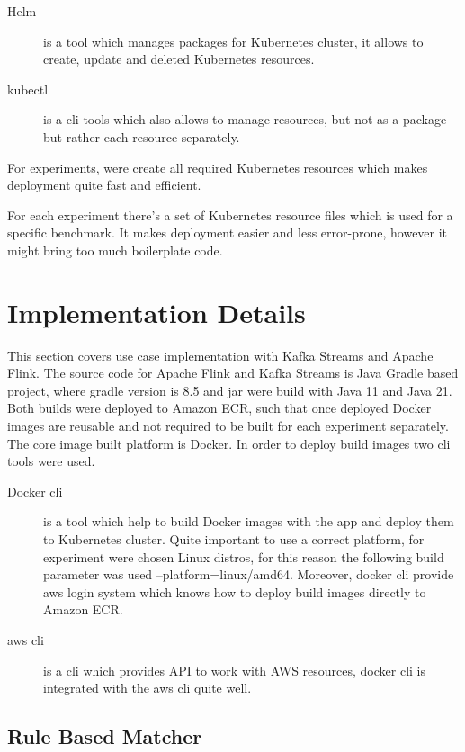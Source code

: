 \begin{description}
    \item[Helm] is a tool which manages packages for Kubernetes cluster, it allows to create,
    update and deleted Kubernetes resources.
    \item[kubectl] is a cli tools which also allows to manage resources, but not as a package but
    rather each resource separately.
\end{description}

For experiments, were create all required Kubernetes resources which makes deployment
quite fast and efficient.

For each experiment there's a set of Kubernetes resource files which is used
for a specific benchmark.
It makes deployment easier and less error-prone, however it might bring
too much boilerplate code.



\section{Implementation Details}\label{sec:implementation-details}
This section covers use case implementation with Kafka Streams and Apache Flink.
The source code for Apache Flink and Kafka Streams is Java Gradle based project,
where gradle version is 8.5 and jar were build with Java 11 and Java 21.
Both builds were deployed to Amazon ECR, such that once deployed Docker images
are reusable and not required to be built for each experiment separately.
The core image built platform is Docker.
In order to deploy build images two cli tools were used.

\begin{description}
    \item[Docker cli] is a tool which help to build Docker images with the app and deploy them
    to Kubernetes cluster.
    Quite important to use a correct platform, for experiment were chosen Linux distros, for
    this reason the following build parameter was used --platform=linux/amd64.
    Moreover, docker cli provide aws login system which knows how to deploy build images directly to
    Amazon ECR.
    \item[aws cli] is a cli which provides API to work with AWS resources, docker cli
    is integrated with the aws cli quite well.
\end{description}


\subsection{Rule Based Matcher}\label{subsec:rule-matcher}

